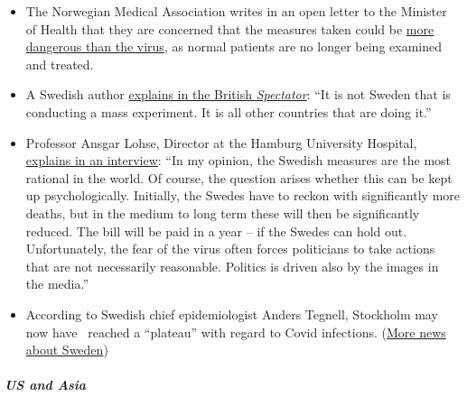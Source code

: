 \begin{itemize}
\tightlist
\item
  The Norwegian Medical Association writes in an open letter to the
  Minister of Health that they are concerned that the measures taken
  could be
  \href{https://www.abcnyheter.no/helse-og-livsstil/helse/2020/04/06/195667780/nesten-halvparten-av-sengene-pa-oslo-universitetssykehus-star-tomme}{more
  dangerous than the virus}, as normal patients are no longer being
  examined and treated.
\item
  A Swedish author
  \href{https://www.spectator.co.uk/article/no-lockdown-please-w-re-swedish}{explains
  in the British \emph{Spectator}}: ``It is not Sweden that is
  conducting a mass experiment. It is all other countries that are doing
  it.''
\item
  Professor Ansgar Lohse, Director at the Hamburg University Hospital,
  \href{https://www.abendblatt.de/hamburg/article228880917/uke-professor-shutdown-lohse-deutschland-hamburg-corona-virus-infektion-covid-19-impfstoff-coronavirus-krise-patienten-immunitaet-krankenhaeuser-kontaktverbot-kliniken-infektionsrate.html}{explains
  in an interview}: ``In my opinion, the Swedish measures are the most
  rational in the world. Of course, the question arises whether this can
  be kept up psychologically. Initially, the Swedes have to reckon with
  significantly more deaths, but in the medium to long term these will
  then be significantly reduced. The bill will be paid in a year -- if
  the Swedes can hold out. Unfortunately, the fear of the virus often
  forces politicians to take actions that are not necessarily
  reasonable. Politics is driven also by the images in the media.''
\item
  According to Swedish chief epidemiologist Anders Tegnell, Stockholm
  may now have~ reached a ``plateau'' with regard to Covid infections.
  (\href{https://www.thelocal.se/20200310/timeline-how-the-coronavirus-has-developed-in-sweden}{More
  news about Sweden})
\end{itemize}

\hypertarget{us-and-asia}{%
\subparagraph{\texorpdfstring{\textbf{US and
Asia}}{US and Asia}}\label{us-and-asia}}

